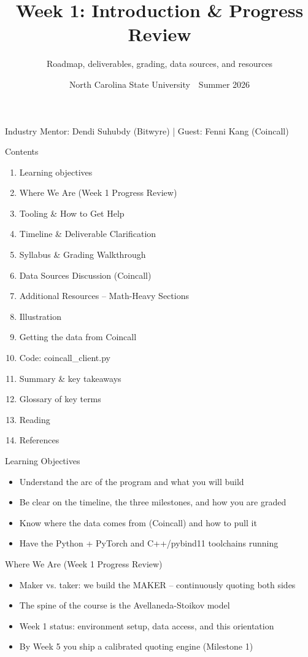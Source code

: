 \documentclass[aspectratio=169,10pt]{beamer}
\title{Week 1: Introduction \& Progress Review}
\subtitle{Roadmap, deliverables, grading, data sources, and resources}
\date{North Carolina State University \,\textbar\, Summer 2026}
\begin{document}
\begin{frame}[plain]\titlepage\begin{center}\tiny Industry Mentor: Dendi Suhubdy (Bitwyre)  |  Guest: Fenni Kang (Coincall)\end{center}\end{frame}
\begin{frame}{Contents}
\small\begin{enumerate}\setlength{\itemsep}{3pt}
  \item Learning objectives
  \item Where We Are (Week 1 Progress Review)
  \item Tooling \& How to Get Help
  \item Timeline \& Deliverable Clarification
  \item Syllabus \& Grading Walkthrough
  \item Data Sources Discussion (Coincall)
  \item Additional Resources -- Math-Heavy Sections
  \item Illustration
  \item Getting the data from Coincall
  \item Code: coincall\_client.py
  \item Summary \& key takeaways
  \item Glossary of key terms
  \item Reading
  \item References
\end{enumerate}
\end{frame}

\begin{frame}{Learning Objectives}
\begin{itemize}
  \item Understand the arc of the program and what you will build
  \item Be clear on the timeline, the three milestones, and how you are graded
  \item Know where the data comes from (Coincall) and how to pull it
  \item Have the Python + PyTorch and C++/pybind11 toolchains running
\end{itemize}
\end{frame}

\begin{frame}{Where We Are (Week 1 Progress Review)}
\begin{itemize}
  \item Maker vs. taker: we build the MAKER -- continuously quoting both sides
  \item The spine of the course is the Avellaneda-Stoikov model
  \item Week 1 status: environment setup, data access, and this orientation
  \item By Week 5 you ship a calibrated quoting engine (Milestone 1)
\end{itemize}
\end{frame}
\end{document}
